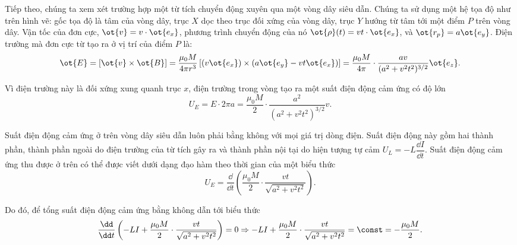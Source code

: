\begin{loigiai}
\begin{enumerate}[1)]
\begin{center}
\end{center}
Tiếp theo, chúng ta xem xét trường hợp một từ tích chuyển động xuyên qua một vòng dây siêu dẫn. Chúng ta sử dụng một hệ tọa độ như trên hình vẽ: gốc tọa độ là tâm của vòng dây, trục $X$ dọc theo trục đối xứng của vòng dây, trục $Y$ hướng từ tâm tới một điểm $P$ trên vòng dây. Vận tốc của đơn cực, $\ot{v} = v\cdot \ot{e_x} $, phương trình chuyển động của nó $\ot{\rho}(t) = vt\cdot \ot{e_x}$, và $\ot{r_p} = a\ot{e_y}$. Điện trường mà đơn cực từ tạo ra ở vị trí của điểm $P$ là:
      \[\ot{E} = \left[\ot{v} \times \ot{B}\right] = \dfrac{\mu_0 M}{4\pi r^3}\left[(v\ot{e_x})\times (a\ot{e_y} - vt\ot{e_x}) \right] = \dfrac{\mu_0  M}{4\pi} \cdot \dfrac{av}{(a^2 + v^2t^2)^{3/2}}\ot{e_z}.\]

Vì điện trường này là đối xứng xung quanh trục $x$, điện trường trong vòng tạo ra một suất điện động cảm ứng có độ lớn
  \[U_E = E\cdot 2\pi a = \dfrac{\mu_0 M}{2} \cdot \dfrac{a^2}{(a^2 + v^2t^2 )^{3/2}}v.\]

Suất điện động cảm ứng ở trên vòng dây siêu dẫn luôn phải bằng không với mọi giá trị dòng điện. Suất điện động này gồm hai thành phần, thành phần ngoài do điện trường của từ tích gây ra và thành phần nội tại do hiện tượng tự cảm $U_L = -L \dfrac{\dd I}{\dd t}$. Suất điện động cảm ứng thu được ở trên có thể được viết dưới dạng đạo hàm theo thời gian của một biểu thức
   \[U_E =\dfrac{\dd}{\dd t} \left(\dfrac{\mu_0 M}{2} \cdot \dfrac{vt}{\sqrt{a^2 + v^2t^2}}\right).\]

Do đó, để tổng suất điện động cảm ứng bằng không dẫn tới biểu thức
  \[\dfrac{\dd}{\dd t} \left( -LI + \dfrac{\mu_0 M}{2}\cdot \dfrac{vt}{\sqrt{a^2 + v^2t^2}}\right)= 0 \Rightarrow - LI + \dfrac{\mu_0M}{2}\cdot \dfrac{vt}{\sqrt{a^2 + v^2t^2}} = \const = - \dfrac{\mu_0 M}{2}.\]


\end{enumerate}
\end{loigiai}
